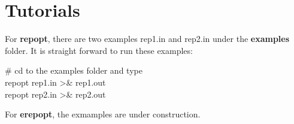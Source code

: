 \chapter{Tutorials}
\label{chap:tutorial}

For \textbf{repopt}, there are two examples rep1.in and rep2.in  under the \textbf{examples} folder. It is straight forward to run these examples:

{\scriptsize
\# cd to the examples folder and type\\
repopt rep1.in >\& rep1.out\\
repopt rep2.in >\& rep2.out\\
}

For \textbf{erepopt}, the exmamples are under construction.